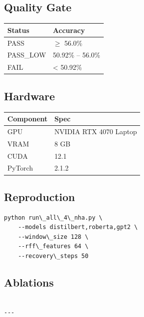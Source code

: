 \subsection{Quality Gate}

\begin{table}[H]
\centering
\small
\begin{tabular}{ll}
\toprule
\textbf{Status} & \textbf{Accuracy} \\
\midrule
PASS & $\ge$ 56.0\% \\
PASS\_LOW & 50.92\% -- 56.0\% \\
FAIL & \textless{} 50.92\% \\
\bottomrule
\end{tabular}
\end{table}

\subsection{Hardware}

\begin{table}[H]
\centering
\small
\begin{tabular}{ll}
\toprule
\textbf{Component} & \textbf{Spec} \\
\midrule
GPU & NVIDIA RTX 4070 Laptop \\
VRAM & 8 GB \\
CUDA & 12.1 \\
PyTorch & 2.1.2 \\
\bottomrule
\end{tabular}
\end{table}

\subsection{Reproduction}

\begin{lstlisting}
python run\_all\_4\_nha.py \
    --models distilbert,roberta,gpt2 \
    --window\_size 128 \
    --rff\_features 64 \
    --recovery\_steps 50
\end{lstlisting}

\subsection{Ablations}

\begin{lstlisting}

---
\end{lstlisting}
